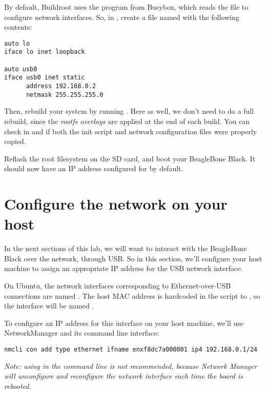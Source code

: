 By default, Buildroot uses the  program from Busybox, which
reads the  file to configure network
interfaces. So, in ,
create a file named  with the following
contents:

\begin{verbatim}
auto lo
iface lo inet loopback

auto usb0
iface usb0 inet static
      address 192.168.0.2
      netmask 255.255.255.0
\end{verbatim}

Then, rebuild your system by running . Here as well, we
don't need to do a full rebuild, since the {\em rootfs overlays} are
applied at the end of each build. You can check in
 and 
if both the init script and network configuration files were properly
copied.

Reflash the root filesystem on the SD card, and boot your BeagleBone
Black. It should now have an IP address configured for  by
default.

\section{Configure the network on your host}

In the next sections of this lab, we will want to interact with the
BeagleBone Black over the network, through USB. So in this section,
we'll configure your host machine to assign an appropriate IP address
for the USB network interface.

On Ubuntu, the network interfaces corresponding to Ethernet-over-USB
connections are named . The host MAC address is
hardcoded in the  script to
, so the interface will be named
.

To configure an IP address for this interface on your host machine,
we'll use NetworkManager and its command line interface:

\begin{verbatim}
nmcli con add type ethernet ifname enxf8dc7a000001 ip4 192.168.0.1/24
\end{verbatim}

{\em Note: using  in the command line is not
recommended, because Network Manager will unconfigure and
reconfigure the network interface each time the board is rebooted.}

